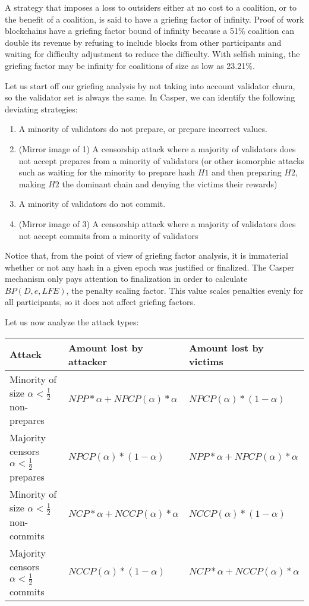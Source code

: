 \documentclass[12pt]{article}
\begin{document}
A strategy that imposes a loss to outsiders either at no cost to a coalition, or to the benefit of a coalition, is said to have a griefing factor of infinity. Proof of work blockchains have a griefing factor bound of infinity because a 51\% coalition can double its revenue by refusing to include blocks from other participants and waiting for difficulty adjustment to reduce the difficulty. With selfish mining, the griefing factor may be infinity for coalitions of size as low as 23.21\%.

Let us start off our griefing analysis by not taking into account validator churn, so the validator set is always the same. In Casper, we can identify the following deviating strategies:

\begin{enumerate}
\item A minority of validators do not prepare, or prepare incorrect values.
\item (Mirror image of 1) A censorship attack where a majority of validators does not accept prepares from a minority of validators (or other isomorphic attacks such as waiting for the minority to prepare hash $H1$ and then preparing $H2$, making $H2$ the dominant chain and denying the victims their rewards)
\item A minority of validators do not commit.
\item (Mirror image of 3) A censorship attack where a majority of validators does not accept commits from a minority of validators
\end{enumerate}

Notice that, from the point of view of griefing factor analysis, it is immaterial whether or not any hash in a given epoch was justified or finalized. The Casper mechanism only pays attention to finalization in order to calculate $BP(D, e, LFE)$, the penalty scaling factor. This value scales penalties evenly for all participants, so it does not affect griefing factors.

Let us now analyze the attack types:

\begin{tabularx}{\textwidth}{|X|X|X|}
\hline
Attack & Amount lost by attacker & Amount lost by victims \\
\hline
Minority of size $\alpha < \frac{1}{2}$ non-prepares & $NPP * \alpha + NPCP(\alpha) * \alpha$ & $NPCP(\alpha) * (1-\alpha)$ \\
Majority censors $\alpha < \frac{1}{2}$ prepares & $NPCP(\alpha) * (1-\alpha)$ & $NPP * \alpha + NPCP(\alpha) * \alpha$ \\
Minority of size $\alpha < \frac{1}{2}$ non-commits & $NCP * \alpha + NCCP(\alpha) * \alpha$ & $NCCP(\alpha) * (1-\alpha)$ \\
Majority censors $\alpha < \frac{1}{2}$ commits & $NCCP(\alpha) * (1-\alpha)$ & $NCP * \alpha + NCCP(\alpha) * \alpha$ \\
\hline
\end{tabularx}
\end{document}
